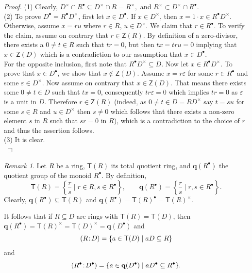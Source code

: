 \documentclass[a4paper, 10pt]{amsart}
\renewcommand{\epsilon}{\varepsilon}
\theoremstyle{plain}
\theoremstyle{definition}
\theoremstyle{remark}
\newtheorem{remark}[theorem]{Remark}
\newcommand{\DP}{\negthinspace : \negthinspace}
\numberwithin{equation}{section}
\begin{document}
	\begin{proof}	
		(1) Clearly, $D^\times \cap R^\bullet\subseteq D^\times \cap R=R^\times,$ and $R^\times \subset D^\times \cap R^\bullet.$\\
		(2) To prove $D^{\bullet}=R^{\bullet}D^\times$, first let $x \in D^{\bullet}$. If $x \in D^\times$, then $x=1\cdot x \in R^{\bullet} D^\times$. Otherwise, assume $x=ru$ where $r \in R$, $u \in D^{\times}$. We claim that $r \in R^{\bullet}$. To verify the claim, assume on contrary that $r \in \mathsf Z(R)$. By definition of a zero-divisor, there exists a $0 \neq t \in R$ such that $tr=0$, but then $tx=tru=0$ implying that $x \in \mathsf Z(D)$ which is a contradiction to our assumption that $x \in D^{\bullet}$. \\
		For the opposite inclusion, first note that $R^{\bullet}D^\times \subseteq D$. Now let $ x \in R^{\bullet}D^\times$. To prove that $ x \in D^{\bullet}$, we show that $x \notin \mathsf Z(D)$. Assume $x=r\epsilon$ for some $r \in R^{\bullet}$ and some $\epsilon \in D^\times$. Now assume on contrary that $x \in \mathsf Z(D)$. That means there exists some $0 \neq t \in D$ such that $tx=0$, consequently $tr\epsilon=0$ which implies $tr=0$ as $\epsilon$ is a unit in $D$. Therefore $r \in \mathsf Z(R)$ (indeed, as $0 \neq t \in D=RD^{\times}$ say $t=su$ for some $s \in R$ and $u\in D^{\times}$ then $s \neq 0$ which follows that there exists a non-zero element $s$ in $R$ such that $sr=0$ in $R$), which is a contradiction to the choice of $r$ and thus the assertion follows. \\
		(3) It is clear. \\
	\end{proof}
    \begin{remark}
		Let $R$ be a ring, $\mathsf{T}(R)$ its total quotient ring, and $\mathbf{q}(R^\bullet)$ the quotient group of the monoid $R^\bullet$. By definition,
		\[\mathsf{T}(R)=\left\{\frac{r}{s}\mid r\in R, s\in R^\bullet\right\}, \qquad\mathbf{q}(R^\bullet)=\left\{\frac{r}{s}\mid r,s\in R^\bullet\right\}.\]
		Clearly, $\mathbf{q}(R^\bullet)\subseteq \mathsf{T}(R)$ and $\mathbf q(R^{\bullet})=\mathsf T(R)^{\bullet} =\mathsf T(R)^{\times}$.

		It follows that if $R\subseteq D$ are rings with $\mathsf T(R) =\mathsf T(D)$, then $\mathbf{q}(R^{\bullet})=\mathsf T(R)^{\times} =\mathsf T(D)^{\times}=\mathbf{q}(D^{\bullet})$ and 
		\[ (R\DP D)=\{a\in \mathsf{T}(D)\mid aD\subseteq R\} \] and \[ (R^\bullet \DP D^\bullet)=\{a\in \mathbf{q}(D^\bullet)\mid aD^\bullet\subseteq R^\bullet\}. \]
	\end{remark}
\end{document}
